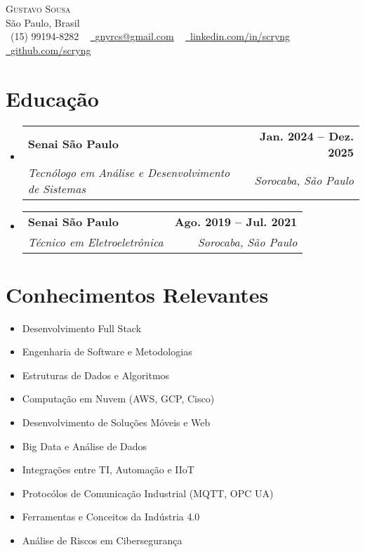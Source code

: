 \documentclass[letterpaper,11pt]{article}
\makeatletter
\newcommand{\resumeSubheading}[4]{
  \vspace{-2pt}\item
    \begin{tabular*}{1.0\textwidth}[t]{l@{\extracolsep{\fill}}r}
      \textbf{#1} & \textbf{\small #2} \\
      \textit{\small#3} & \textit{\small #4} \\
    \end{tabular*}\vspace{-7pt}
}
\newcommand{\resumeSubHeadingListStart}{\begin{itemize}[leftmargin=0.0in, label={}]}
\newcommand{\resumeSubHeadingListEnd}{\end{itemize}}
\makeatother
\begin{document}
\begin{center}
    {\Huge \scshape Gustavo Sousa} \\ \vspace{1pt}
    São Paulo, Brasil \\ \vspace{1pt}
    \small \raisebox{-0.1\height}\faPhone\ (15) 99194-8282 ~ 
    \href{mailto:gnyrcs@gmail.com}{\raisebox{-0.2\height}\faEnvelope\  \underline{gnyrcs@gmail.com}} ~ 
    \href{https://linkedin.com/in/scryng}{\raisebox{-0.2\height}\faLinkedin\ \underline{linkedin.com/in/scryng}}  ~
    \href{https://github.com/scryng}{\raisebox{-0.2\height}\faGithub\ \underline{github.com/scryng}}
    \vspace{-8pt}
\end{center}

\section{Educação}
  \resumeSubHeadingListStart
    \resumeSubheading
      {Senai São Paulo}{Jan. 2024 -- Dez. 2025}
      {Tecnólogo em Análise e Desenvolvimento de Sistemas}{Sorocaba, São Paulo}
    \resumeSubheading
      {Senai São Paulo}{Ago. 2019 -- Jul. 2021}
      {Técnico em Eletroeletrônica}{Sorocaba, São Paulo}
  \resumeSubHeadingListEnd

\section{Conhecimentos Relevantes}
    \begin{multicols}{2}
        \begin{itemize}[itemsep=-5pt, parsep=3pt]
            \item\small Desenvolvimento Full Stack
            \item Engenharia de Software e Metodologias
            \item Estruturas de Dados e Algoritmos
            \item Computação em Nuvem (AWS, GCP, Cisco)
            \item Desenvolvimento de Soluções Móveis e Web
            \item Big Data e Análise de Dados
            \item Integrações entre TI, Automação e IIoT
            \item Protocólos de Comunicação Industrial (MQTT, OPC UA)
            \item Ferramentas e Conceitos da Indústria 4.0
            \item Análise de Riscos em Cibersegurança
        \end{itemize}
    \end{multicols}
    \vspace*{2.0\multicolsep}
\end{document}
